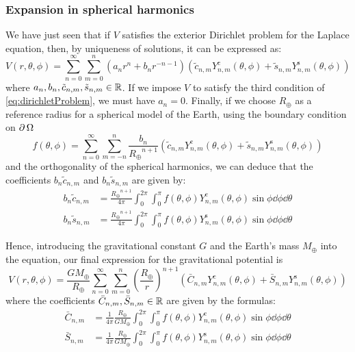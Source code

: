 \documentclass[../main.tex]{subfiles}
\begin{document}
\subsubsection{Expansion in spherical harmonics}\label{sec:laplace_spherical_potential}
We have just seen that if $V$ satisfies the exterior Dirichlet problem for the Laplace equation, then, by uniqueness of solutions, it can be expressed as:
\begin{equation}\label{eq:prePotential}
  V(r,\theta,\phi) = \sum_{n=0}^\infty \sum_{m=0}^n (a_n r^{n} +b_{n}r^{-n-1})(\tilde{c}_{n,m}Y_{n,m}^{\mathrm{c}}(\theta,\phi)+\tilde{s}_{n,m}Y_{n,m}^{\mathrm{s}}(\theta,\phi))
\end{equation}
where $a_n,b_n,\tilde{c}_{n,m},\tilde{s}_{n,m}\in\mathbb{R}$. If we impose $V$ to satisfy the third condition of \cref{eq:dirichletProblem}, we must have $a_{n}=0$.
Finally, if we choose $R_\oplus$ as a reference radius for a spherical model of the Earth, using the boundary condition on $\operatorname{\partial}{\Omega}$
\begin{equation}
  f(\theta,\phi) = \sum_{n=0}^\infty \sum_{m=-n}^n \frac{b_{n}}{{R_\oplus}^{n+1}}(\tilde{c}_{n,m}Y_{n,m}^{\mathrm{c}}(\theta,\phi)+\tilde{s}_{n,m}Y_{n,m}^{\mathrm{s}}(\theta,\phi))
\end{equation}
and the orthogonality of the spherical harmonics, we can deduce that the coefficients $b_n\tilde{c}_{n,m}$ and $b_n\tilde{s}_{n,m}$ are given by:
\begin{align}
  b_n\tilde{c}_{n,m} & =\frac{{R_\oplus}^{n+1}}{4\pi}\int_0^{2\pi}\int_0^\pi f(\theta,\phi) Y_{n,m}^\mathrm{c}(\theta,\phi)\sin\phi\dd{\phi}\dd{\theta} \\
  b_n\tilde{s}_{n,m} & =\frac{{R_\oplus}^{n+1}}{4\pi}\int_0^{2\pi}\int_0^\pi f(\theta,\phi) Y_{n,m}^\mathrm{s}(\theta,\phi)\sin\phi\dd{\phi}\dd{\theta}
\end{align}

Hence, introducing the gravitational constant $G$ and the Earth's mass $M_\oplus$ into the equation, our final expression for the gravitational potential is
\begin{equation}\label{eq:Potential}
  V(r,\theta,\phi) =\frac{GM_\oplus}{R_\oplus}\sum_{n=0}^\infty \sum_{m=0}^n{\left(\frac{{R_\oplus}}{r}\right)}^{n+1}(\bar{C}_{n,m}Y_{n,m}^{\mathrm{c}}(\theta,\phi)+\bar{S}_{n,m}Y_{n,m}^{\mathrm{s}}(\theta,\phi))
\end{equation}
where the coefficients $\bar{C}_{n,m},\bar{S}_{n,m}\in\mathbb{R}$ are given by the formulas:
\begin{align}
  \bar{C}_{n,m} & =\frac{1}{4\pi}\frac{R_\oplus}{G M_\oplus}\int_0^{2\pi}\int_0^\pi f(\theta,\phi)  Y_{n,m}^\mathrm{c}(\theta,\phi)\sin\phi\dd{\phi}\dd{\theta} \\
  \bar{S}_{n,m} & =\frac{1}{4\pi}\frac{R_\oplus}{G M_\oplus}\int_0^{2\pi}\int_0^\pi f(\theta,\phi)  Y_{n,m}^\mathrm{s}(\theta,\phi)\sin\phi\dd{\phi}\dd{\theta}
\end{align}
\end{document}
